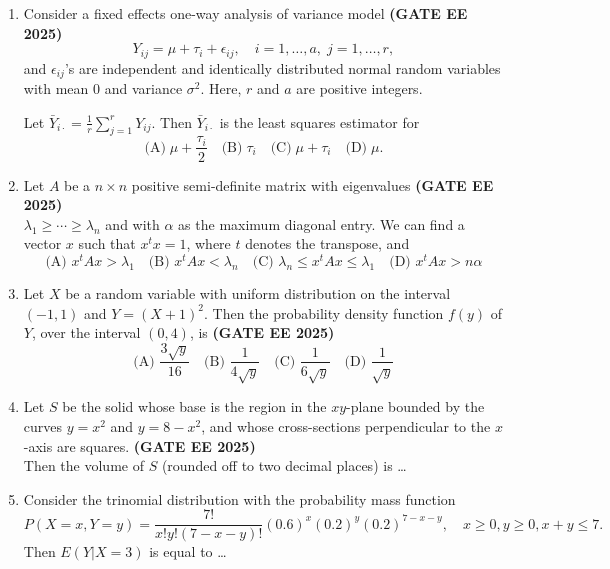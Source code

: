 \documentclass[journal,12pt,onecolumn]{IEEEtran}
\theoremstyle{remark}
\begin{document}
\begin{enumerate}
\item Consider a fixed effects one-way analysis of variance model \hfill \textbf{(GATE EE 2025)}\\
\[
Y_{ij} = \mu + \tau_i + \epsilon_{ij}, \quad 
i=1,\dots,a, \; j=1,\dots,r,
\]
and $\epsilon_{ij}$'s are independent and identically distributed normal random variables with mean $0$ and variance $\sigma^2$. Here, $r$ and $a$ are positive integers.  

Let $\bar{Y}_{i\cdot} = \frac{1}{r}\sum_{j=1}^r Y_{ij}$. Then $\bar{Y}_{i\cdot}$ is the least squares estimator for
\[
\text{(A)} \; \mu + \frac{\tau_i}{2} 
\quad
\text{(B)} \; \tau_i
\quad
\text{(C)} \; \mu + \tau_i
\quad
\text{(D)} \; \mu.
\]

\item Let $A$ be a $n \times n$ positive semi-definite matrix with eigenvalues  \hfill \textbf{(GATE EE 2025)}\\
$\lambda_1 \ge \cdots \ge \lambda_n$ and with $\alpha$ as the maximum diagonal entry. 
We can find a vector $x$ such that $x^t x = 1$, where $t$ denotes the transpose, and
\[
\text{(A) } x^t A x > \lambda_1 \quad 
\text{(B) } x^t A x < \lambda_n \quad 
\text{(C) } \lambda_n \le x^t A x \le \lambda_1 \quad 
\text{(D) } x^t A x > n\alpha
\]


\item Let $X$ be a random variable with uniform distribution on the interval $(-1,1)$ and $Y = (X+1)^2$. 
Then the probability density function $f(y)$ of $Y$, over the interval $(0,4)$, is \hfill \textbf{(GATE EE 2025)}\\
\[
\text{(A) } \frac{3\sqrt{y}}{16} \quad 
\text{(B) } \frac{1}{4\sqrt{y}} \quad 
\text{(C) } \frac{1}{6\sqrt{y}} \quad 
\text{(D) } \frac{1}{\sqrt{y}}
\]
\item Let $S$ be the solid whose base is the region in the $xy$-plane bounded by the curves 
$y = x^2$ and $y = 8 - x^2$, and whose cross-sections perpendicular to the $x$-axis are squares. \hfill \textbf{(GATE EE 2025)}\\
Then the volume of $S$ (rounded off to two decimal places) is \dots
\item Consider the trinomial distribution with the probability mass function
\[
P(X = x, Y = y) = \frac{7!}{x! y! (7-x-y)!} (0.6)^x (0.2)^y (0.2)^{7-x-y}, 
\quad x \ge 0, y \ge 0, x+y \le 7.
\]
Then $E(Y|X=3)$ is equal to \dots



\end{enumerate}
\end{document}
